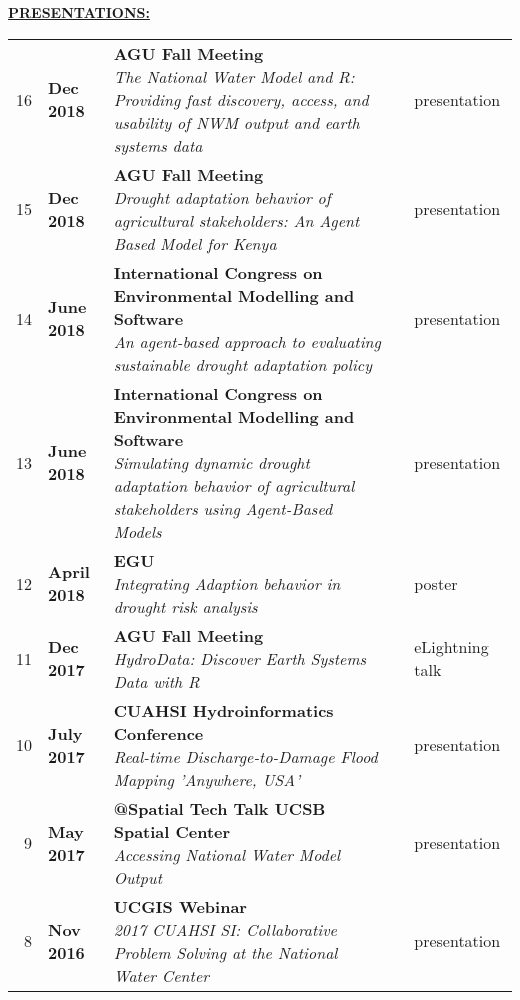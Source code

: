 \documentclass{article}
\newcommand{\header}[1]{\hspace{-5mm}\textcolor{header_blue}{\underline{\textbf{#1}}\\}} %
\begin{document}
\header{PRESENTATIONS:}
\vspace{-4mm}
\setlength\LTleft{1.1mm}
\begin{longtable}{rp{2.5cm}P{8.5cm}p{1cm}P{2cm}}
  16 & \textbf{Dec 2018 } & {\textbf{AGU Fall Meeting} \newline \textit{The National Water Model and R: Providing fast discovery, access, and usability of NWM output and earth systems data } } &  & presentation \\ 
  15 & \textbf{Dec 2018 } & {\textbf{AGU Fall Meeting} \newline \textit{Drought adaptation behavior of agricultural stakeholders: An Agent Based Model for Kenya } } &  & presentation \\ 
  14 & \textbf{June 2018 } & {\textbf{International Congress on Environmental Modelling and Software} \newline \textit{An agent-based approach to evaluating sustainable drought adaptation policy } } &  & presentation \\ 
  13 & \textbf{June 2018 } & {\textbf{International Congress on Environmental Modelling and Software} \newline \textit{Simulating dynamic drought adaptation behavior of agricultural stakeholders using Agent-Based Models } } &  & presentation \\ 
  12 & \textbf{April 2018 } & {\textbf{EGU} \newline \textit{Integrating Adaption behavior in drought risk analysis } } &  & poster \\ 
  11 & \textbf{Dec 2017 } & {\textbf{AGU Fall Meeting} \newline \textit{HydroData: Discover Earth Systems Data with R } } &  & eLightning talk \\ 
  10 & \textbf{July 2017 } & {\textbf{CUAHSI Hydroinformatics Conference} \newline \textit{Real-time Discharge-to-Damage Flood Mapping 'Anywhere, USA' } } &  & presentation \\ 
  9 & \textbf{May 2017 } & {\textbf{@Spatial Tech Talk UCSB Spatial Center} \newline \textit{Accessing National Water Model Output } } &  & presentation \\ 
  8 & \textbf{Nov 2016 } & {\textbf{UCGIS Webinar} \newline \textit{2017 CUAHSI SI: Collaborative Problem Solving at the National Water Center } } &  & presentation \\ 

\end{longtable}
\end{document}
